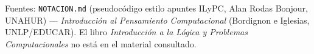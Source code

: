 \documentclass[a4paper,11pt,landscape]{article}
\begin{document}
\vspace{2mm}
\begin{center}
  {\footnotesize\sffamily\color{grisT}
  Fuentes: \texttt{NOTACION.md} (pseudocódigo estilo apuntes ILyPC, Alan Rodas Bonjour, UNAHUR) --- \textit{Introducción al Pensamiento Computacional} (Bordignon e Iglesias, UNLP/EDUCAR). El libro \textit{Introducción a la Lógica y Problemas Computacionales} no está en el material consultado.
  }
\end{center}
\end{document}
